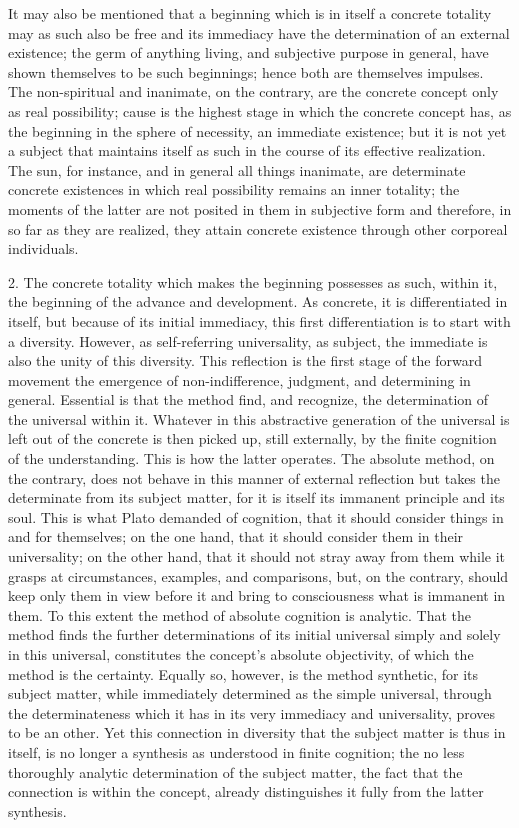 It may also be mentioned that a beginning
which is in itself a concrete totality may as such
also be free and its immediacy have
the determination of an external existence;
the germ of anything living,
and subjective purpose in general,
have shown themselves to be such beginnings;
hence both are themselves impulses.
The non-spiritual and inanimate, on the contrary,
are the concrete concept only as real possibility;
cause is the highest stage in which the concrete concept has,
as the beginning in the sphere of necessity,
an immediate existence;
but it is not yet a subject
that maintains itself as such
in the course of its effective realization.
The sun, for instance,
and in general all things inanimate,
are determinate concrete existences
in which real possibility remains an inner totality;
the moments of the latter are not posited in them
in subjective form and therefore,
in so far as they are realized,
they attain concrete existence
through other corporeal individuals.

2. The concrete totality which makes the beginning
possesses as such, within it, the beginning of
the advance and development.
As concrete, it is differentiated in itself,
but because of its initial immediacy, this first
differentiation is to start with a diversity.
However, as self-referring universality, as subject,
the immediate is also the unity of this diversity.
This reflection is the first stage of the forward movement
the emergence of non-indifference, judgment, and determining in general.
Essential is that the method find, and recognize,
the determination of the universal within it.
Whatever in this abstractive generation of the universal
is left out of the concrete is then picked up, still externally,
by the finite cognition of the understanding.
This is how the latter operates.
The absolute method, on the contrary, does not behave
in this manner of external reflection
but takes the determinate from its subject matter,
for it is itself its immanent principle and its soul.
This is what Plato demanded of cognition,
that it should consider things in and for themselves;
on the one hand, that it should consider them in their universality;
on the other hand, that it should not stray away from them
while it grasps at circumstances, examples, and comparisons,
but, on the contrary, should keep only them in view before it
and bring to consciousness what is immanent in them.
To this extent the method of absolute cognition is analytic.
That the method finds the further determinations
of its initial universal simply and solely in this universal,
constitutes the concept's absolute objectivity,
of which the method is the certainty.
Equally so, however, is the method synthetic,
for its subject matter,
while immediately determined as the simple universal,
through the determinateness which it has
in its very immediacy and universality,
proves to be an other.
Yet this connection in diversity
that the subject matter is thus in itself,
is no longer a synthesis as understood in finite cognition;
the no less thoroughly analytic determination of the subject matter,
the fact that the connection is within the concept,
already distinguishes it fully from the latter synthesis.


